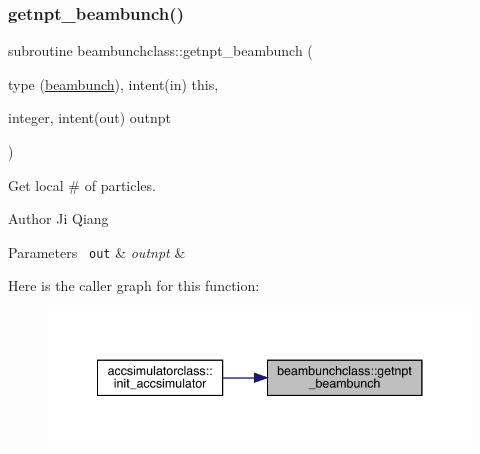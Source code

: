 \mbox{\label{namespacebeambunchclass_aec332b229b76111b68db82b20ab2846e}} 
\subsubsection{\texorpdfstring{getnpt\_beambunch()}{getnpt\_beambunch()}}
{\footnotesize\ttfamily subroutine beambunchclass\+::getnpt\+\_\+beambunch (\begin{DoxyParamCaption}\item[{type (\mbox{\hyperlink{namespacebeambunchclass_structbeambunchclass_1_1beambunch}{beambunch}}), intent(in)}]{this,  }\item[{integer, intent(out)}]{outnpt }\end{DoxyParamCaption})}



Get local \# of particles. 

\begin{DoxyAuthor}{Author}
Ji Qiang 
\end{DoxyAuthor}

\begin{DoxyParams}[1]{Parameters}
\mbox{\texttt{ out}}  & {\em outnpt} & \\
\hline
\end{DoxyParams}
Here is the caller graph for this function\+:\nopagebreak
\begin{figure}[H]
\begin{center}
\leavevmode
\includegraphics[width=341pt]{namespacebeambunchclass_aec332b229b76111b68db82b20ab2846e_icgraph}
\end{center}
\end{figure}
\mbox{\label{namespacebeambunchclass_ac4e7c6a08c052c9bbc3c2bb1703adea6}} 
